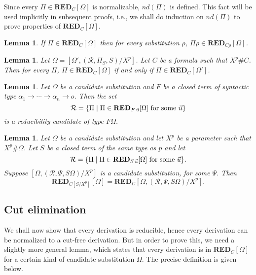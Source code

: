 \documentclass[preprint]{elsarticle}
\def\Rscr{{\mathcal R}}
\newcommand{\ra}{\to}
\def\RED{{\mathbf{RED}}}
\newtheorem{lemma}[thm]{Lemma}
\begin{document}
Since every $\Pi \in \RED_C[\Omega]$ is normalizable,
$nd(\Pi)$ is defined. This fact will be used implicitly in subsequent
proofs, i.e., we shall do induction on
$nd(\Pi)$ to prove properties of $\RED_C[\Omega]$. 

\begin{lemma}
  \label{lm:red-subst}
  If $\Pi \in \RED_C[\Omega]$ then for every substitution $\rho$, 
  $\Pi\rho \in \RED_{C\rho}[\Omega]$. 
\end{lemma}


\begin{lemma}
\label{lm:red vacuous}
Let $\Omega = [\Omega', (\Rscr, \Pi_S, S)/ X^p]$.
Let $C$ be a formula such that $X^p \# C$. 
Then for every $\Pi$,  $\Pi \in \RED_C[\Omega]$ if and only if
$\Pi \in \RED_C[\Omega']$. 
\end{lemma}


\begin{lemma}
\label{lm:red candidate}
Let $\Omega$ be a candidate substitution and $F$ be a closed term of
syntactic type $\alpha_1 \ra \cdots \ra \alpha_n \ra o$. Then the set
$$
\Rscr = \{\Pi \mid \Pi \in \RED_{F\,\vec u}[\Omega] \ \hbox{for some $\vec u$} \}
$$
is a reducibility candidate of type $F\Omega$.
\end{lemma}


\begin{lemma}
\label{lm:red param subst}
Let $\Omega$ be a candidate substitution and let $X^p$
be a parameter such that $X^p \# \Omega$. 
Let $S$ be a closed term of the same type as $p$ and let
$$
\Rscr = \{\Pi \mid \Pi \in \RED_{S\,\vec u}[\Omega] \ \hbox{for some $\vec u$} \}.
$$
Suppose $[\Omega, (\Rscr, \Psi, S\Omega)/ X^p]$ is a candidate
substitution, for some $\Psi$. 
Then
$$
\RED_{C[S/X^p]}[\Omega] = \RED_C[\Omega, (\Rscr, \Psi, S\Omega)/X^p].
$$
\end{lemma}




\subsection{Cut elimination}
\label{sec:ceproof}

We shall now show that every derivation is reducible, hence every
derivation can be normalized to a cut-free derivation.  But in order
to prove this, we need a slightly more general lemma, which states
that every derivation is in $\RED_C[\Omega]$ for a certain kind of
candidate substitution $\Omega$.  The precise definition is given
below.
\end{document}
